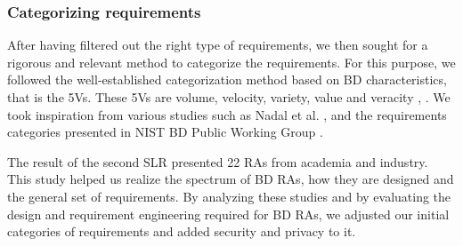 \documentclass{bmcart}
\begin{document}
\subsubsection{Categorizing requirements} After having filtered out the right type of requirements, we then sought for a rigorous and relevant method to categorize the requirements. For this purpose, we followed the well-established categorization method based on BD characteristics, that is the 5Vs. These 5Vs are volume, velocity, variety, value and veracity  \cite{Bughin2016}, \cite{rad2017big}. We took inspiration from various studies such as Nadal et al. \cite{nadal2017software}, and the requirements categories presented in NIST BD Public Working Group \cite{Chang.2019}.



The result of the second SLR presented 22 RAs from academia and industry. This study helped us realize the spectrum of BD RAs, how they are designed and the general set of requirements. By analyzing these studies and by evaluating the design and requirement engineering required for BD RAs, we adjusted our initial categories of requirements and added security and privacy to it. 
\end{document}
